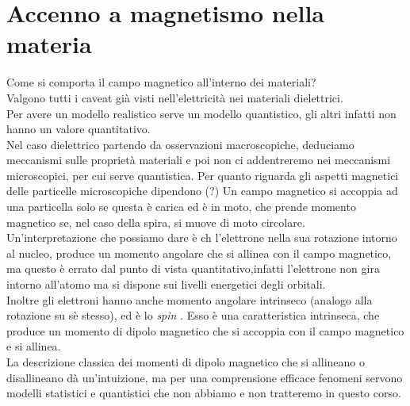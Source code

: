 \section{Accenno a magnetismo nella materia}
Come si comporta il campo magnetico all'interno dei materiali?\\
Valgono tutti i caveat già visti nell'elettricità nei materiali dielettrici.\\
Per avere un modello realistico serve un modello quantistico, gli altri infatti non hanno un valore quantitativo.\\
Nel caso dielettrico partendo da osservazioni macroscopiche, deduciamo meccanismi sulle proprietà materiali e poi non ci addentreremo nei meccanismi microscopici, per cui serve quantistica. Per quanto riguarda gli aspetti magnetici delle particelle microscopiche dipendono (?)
Un campo magnetico si accoppia ad una particella solo se questa è carica ed è in moto, che prende momento magnetico se, nel caso della spira, si muove di moto circolare.\\
Un'interpretazione che possiamo dare è ch l'elettrone nella sua rotazione intorno al  nucleo, produce un momento angolare che si allinea con il campo magnetico, ma questo è errato dal punto di vista quantitativo,infatti l'elettrone non gira intorno all'atomo ma si dispone sui livelli energetici degli orbitali.\\
Inoltre gli elettroni hanno anche momento angolare intrinseco (analogo alla rotazione su sè stesso), ed è lo \textit{spin} . Esso è una caratteristica intrinseca, che produce un momento di dipolo magnetico che si accoppia con il campo magnetico e si allinea.\\
La descrizione classica dei momenti di dipolo magnetico che si allineano o disallineano dà un'intuizione, ma per una comprensione efficace fenomeni servono modelli statistici e quantistici che non abbiamo e non tratteremo in questo corso.

